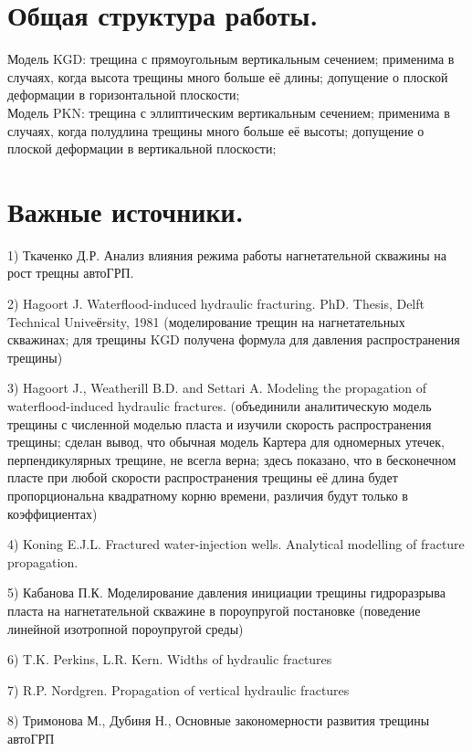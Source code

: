 \documentclass[a4paper, 11pt]{article}
\begin{document}
\section{Общая структура работы.}

Модель KGD: трещина с прямоугольным вертикальным сечением; применима в случаях, когда высота трещины много больше её длины; допущение о плоской деформации в горизонтальной плоскости;
\\

Модель PKN: трещина с эллиптическим вертикальным сечением; применима в случаях, когда полудлина трещины много больше её высоты; допущение о плоской деформации в вертикальной плоскости;
\\

\section{Важные источники.}

1) Ткаченко Д.Р. Анализ влияния режима работы нагнетательной скважины на рост трещны автоГРП.

2) Hagoort J. Waterflood-induced hydraulic fracturing. PhD. Thesis, Delft Technical Univeёrsity, 1981 (моделирование трещин на нагнетательных скважинах; для трещины KGD получена формула для давления распространения трещины)

3) Hagoort J., Weatherill B.D. and Settari A. Modeling the propagation of waterflood-induced hydraulic fractures. (объединили аналитическую модель трещины с численной моделью пласта и изучили скорость распространения трещины; сделан вывод, что обычная модель Картера для одномерных утечек, перпендикулярных трещине, не всегла верна; здесь показано, что в бесконечном пласте при любой скорости распространения трещины её длина будет пропорциональна квадратному корню времени, различия будут только в коэффициентах)

4) Koning E.J.L. Fractured water-injection wells. Analytical modelling of fracture propagation.

5) Кабанова П.К. Моделирование давления инициации трещины гидроразрыва пласта на нагнетательной скважине в пороупругой постановке (поведение линейной изотропной пороупругой среды)

6) T.K. Perkins, L.R. Kern. Widths of hydraulic fractures

7) R.P. Nordgren. Propagation of vertical hydraulic fractures

8) Тримонова М., Дубиня Н., Основные закономерности развития трещины автоГРП
\end{document}
